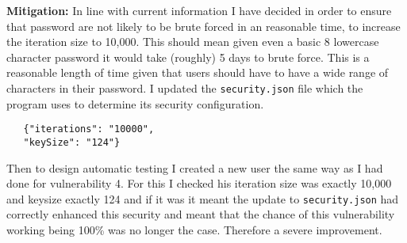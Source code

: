 \textbf{Mitigation:} In line with current information I have decided in order to ensure that password are not likely to be brute forced in an reasonable time, to increase the
iteration size to 10,000\cite{10.1007/978-3-030-11437-4_8}. This should mean given even a basic 8 lowercase character password it would take (roughly) 5 days to brute force. This is a reasonable length of time
given that users should have to have a wide range of characters in their password. I updated the \verb|security.json| file which the program uses to determine its security
configuration.
\begin{verbatim}
   {"iterations": "10000",
   "keySize": "124"}
\end{verbatim}
Then to design automatic testing I created a new user the same way as I had done for vulnerability 4. For this I checked his iteration size was exactly 10,000 and keysize exactly 124 and if it was
it meant the update to \verb|security.json| had correctly enhanced this security and meant that the chance of this vulnerability working being 100\% was no longer the case. Therefore
a severe improvement.
